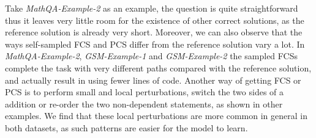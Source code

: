 Take \textit{MathQA-Example-2} as an example, the question is quite straightforward thus it leaves very little room for the existence of other correct solutions, as the reference solution is already very short.
Moreover, we can also observe that the ways self-sampled FCS and PCS differ from the reference solution vary a lot. In \textit{MathQA-Example-2}, \textit{GSM-Example-1} and \textit{GSM-Example-2} the sampled FCSs complete the task with very different paths compared with the reference solution, and actually result in using fewer lines of code. Another way of getting FCS or PCS is to perform small and local perturbations, \eg switch the two sides of a addition or re-order the two non-dependent statements, as shown in other examples. We find that these local perturbations are more common in general in both datasets, as such patterns are easier for the model to learn.

